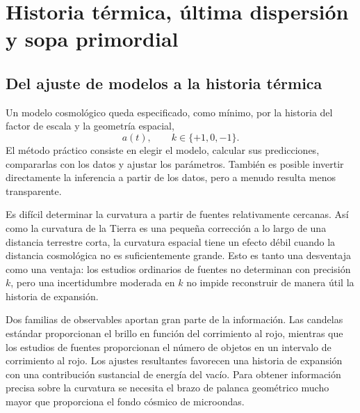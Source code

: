 \chapter{Historia térmica, última dispersión y sopa primordial}


\section{Del ajuste de modelos a la historia térmica}

Un modelo cosmológico queda especificado, como mínimo, por la historia del factor de escala y la geometría espacial,
\begin{equation}
a(t),
\qquad
k\in\{+1,0,-1\}.
\end{equation}
El método práctico consiste en elegir el modelo, calcular sus predicciones, compararlas con los datos y ajustar los parámetros. También es posible invertir directamente la inferencia a partir de los datos, pero a menudo resulta menos transparente.

Es difícil determinar la curvatura a partir de fuentes relativamente cercanas. Así como la curvatura de la Tierra es una pequeña corrección a lo largo de una distancia terrestre corta, la curvatura espacial tiene un efecto débil cuando la distancia cosmológica no es suficientemente grande. Esto es tanto una desventaja como una ventaja: los estudios ordinarios de fuentes no determinan con precisión \(k\), pero una incertidumbre moderada en \(k\) no impide reconstruir de manera útil la historia de expansión.

Dos familias de observables aportan gran parte de la información. Las candelas estándar proporcionan el brillo en función del corrimiento al rojo, mientras que los estudios de fuentes proporcionan el número de objetos en un intervalo de corrimiento al rojo. Los ajustes resultantes favorecen una historia de expansión con una contribución sustancial de energía del vacío. Para obtener información precisa sobre la curvatura se necesita el brazo de palanca geométrico mucho mayor que proporciona el fondo cósmico de microondas.

